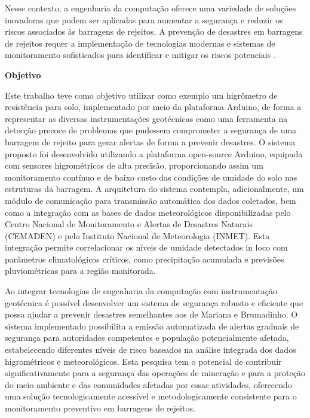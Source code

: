 Nesse contexto, a engenharia da computação oferece uma variedade de soluções inovadoras que podem ser aplicadas para aumentar a segurança e reduzir os riscos associados às barragens de rejeitos. A prevenção de desastres em barragens de rejeitos requer a implementação de tecnologias modernas e sistemas de monitoramento sofisticados para identificar e mitigar os riscos potenciais \cite{ICMM2021}.
    
\vspace{0.5cm}
\textbf{Objetivo}
\vspace{0.5cm}

Este trabalho teve como objetivo utilizar como exemplo um higrômetro de resistência para solo, implementado por meio da plataforma Arduino, de forma a representar as diversas instrumentações geotécnicas como uma ferramenta na detecção precoce de problemas que pudessem comprometer a segurança de uma barragem de rejeito para gerar alertas de forma a prevenir desastres. O sistema proposto foi desenvolvido utilizando a plataforma open-source Arduino, equipada com sensores higrométricos de alta precisão, proporcionando assim um monitoramento contínuo e de baixo custo das condições de umidade do solo nas estruturas da barragem. A arquitetura do sistema contempla, adicionalmente, um módulo de comunicação para transmissão automática dos dados coletados, bem como a integração com as bases de dados meteorológicos disponibilizadas pelo Centro Nacional de Monitoramento e Alertas de Desastres Naturais (CEMADEN) e pelo Instituto Nacional de Meteorologia (INMET). Esta integração permite correlacionar os níveis de umidade detectados in loco com parâmetros climatológicos críticos, como precipitação acumulada e previsões pluviométricas para a região monitorada.

Ao integrar tecnologias de engenharia da computação com instrumentação geotécnica é possível desenvolver um sistema de segurança robusto e eficiente que possa ajudar a prevenir desastres semelhantes aos de Mariana e Brumadinho. O sistema implementado possibilita a emissão automatizada de alertas graduais de segurança para autoridades competentes e população potencialmente afetada, estabelecendo diferentes níveis de risco baseados na análise integrada dos dados higrométricos e meteorológicos. Esta pesquisa tem o potencial de contribuir significativamente para a segurança das operações de mineração e para a proteção do meio ambiente e das comunidades afetadas por essas atividades, oferecendo uma solução tecnologicamente acessível e metodologicamente consistente para o monitoramento preventivo em barragens de rejeitos.

